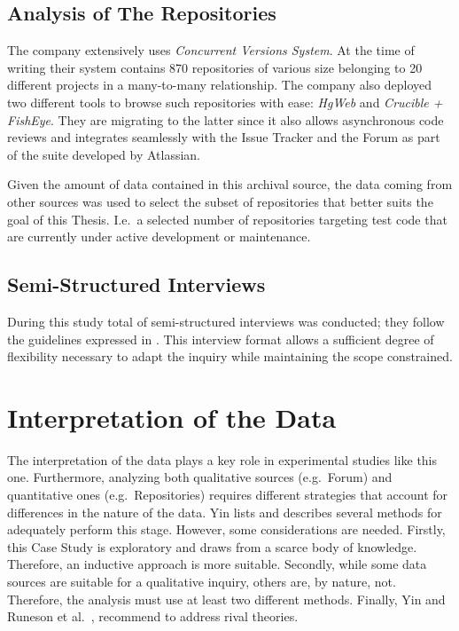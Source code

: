 \subsection{Analysis of The Repositories} \label{sec:analysis_of_the_repos}
The company extensively uses \textit{Concurrent Versions System}. At the time of writing their system contains 870 repositories of various size belonging to 20 different projects in a many-to-many relationship. The company also deployed two different tools to browse such repositories with ease: \textit{HgWeb} and \textit{Crucible + FishEye}. They are migrating to the latter since it also allows asynchronous code reviews and integrates seamlessly with the Issue Tracker and the Forum as part of the suite developed by Atlassian.

Given the amount of data contained in this archival source, the data coming from other sources was used to select the subset of repositories that better suits the goal of this Thesis. I.e.\ a selected number of repositories targeting test code that are currently under active development or maintenance.


\subsection{Semi-Structured Interviews} \label{sec:semi-structured_interviews}
During this study total of  semi-structured interviews was conducted; they follow the guidelines expressed in \cite{interview_guideline}. This interview format allows a sufficient degree of flexibility necessary to adapt the inquiry while maintaining the scope constrained.




%
%
%
%


%
%
%
%
\section{Interpretation of the Data} \label{data_interpretation}

The interpretation of the data plays a key role in experimental studies like this one. Furthermore, analyzing both qualitative sources (e.g.\ Forum) and quantitative ones (e.g.\ Repositories) requires different strategies that account for differences in the nature of the data. Yin \cite{case_study_guide} lists and describes several methods for adequately perform this stage. However, some considerations are needed. Firstly, this Case Study is exploratory and draws from a scarce body of knowledge. Therefore, an inductive approach is more suitable. Secondly, while some data sources are suitable for a qualitative inquiry, others are, by nature, not. Therefore, the analysis must use at least two different methods. Finally, Yin \cite{case_study_guide} and Runeson et al.\ \cite{case_study_software_engineering}, recommend to address rival theories.   


